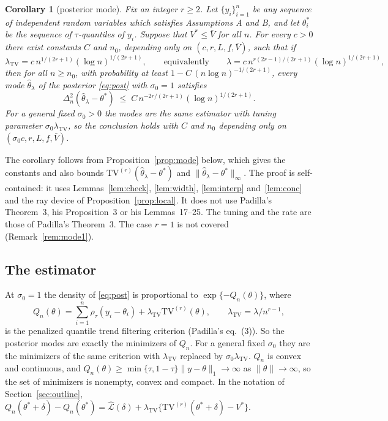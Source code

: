 \documentclass[11pt]{article}
\newtheorem{corollary}{Corollary}
\theoremstyle{definition}
\theoremstyle{remark}
\newcommand{\TV}{\mathrm{TV}}
\newcommand{\lamtv}{\lambda_{\TV}}
\newcommand{\thetas}{\theta^{*}}
\newcommand{\Lh}{\widehat{\mathcal L}}
\newcommand{\fl}{\underline f}
\newcommand{\Vb}{\bar V}
\begin{document}
\begin{corollary}[posterior mode]\label{cor:mode}
Fix an integer $r\ge 2$. Let $\{y_i\}_{i=1}^n$ be any sequence of independent random variables which satisfies Assumptions A and B, and let $\thetas_i$ be the sequence of $\tau$-quantiles of $y_i$. Suppose that $V^{*}\le\Vb$ for all $n$. For every $c>0$ there exist constants $C$ and $n_0$, depending only on $(c,r,L,\fl,\Vb)$, such that if
\[
\lamtv=c\,n^{1/(2r+1)}(\log n)^{1/(2r+1)},\qquad\text{equivalently}\qquad\lambda=c\,n^{r(2r-1)/(2r+1)}(\log n)^{1/(2r+1)},
\]
then for all $n\ge n_0$, with probability at least $1-C\,(n\log n)^{-1/(2r+1)}$, every mode $\hat\theta_\lambda$ of the posterior \eqref{eq:post} with $\sigma_0=1$ satisfies
\[
\Delta_n^2(\hat\theta_\lambda-\thetas)\;\le\;C\,n^{-2r/(2r+1)}(\log n)^{1/(2r+1)} .
\]
For a general fixed $\sigma_0>0$ the modes are the same estimator with tuning parameter $\sigma_0\lamtv$, so the conclusion holds with $C$ and $n_0$ depending only on $(\sigma_0c,r,L,\fl,\Vb)$.
\end{corollary}

The corollary follows from Proposition~\ref{prop:mode} below, which gives the constants and also bounds $\TV^{(r)}(\hat\theta_\lambda-\thetas)$ and $\|\hat\theta_\lambda-\thetas\|_\infty$. The proof is self-contained: it uses Lemmas~\ref{lem:check}, \ref{lem:width}, \ref{lem:interp} and~\ref{lem:conc} and the ray device of Proposition~\ref{prop:local}. It does not use Padilla's Theorem~3, his Proposition~3 or his Lemmas~17--25. The tuning and the rate are those of Padilla's Theorem~3. The case $r=1$ is not covered (Remark~\ref{rem:mode1}).

\subsection{The estimator}

At $\sigma_0=1$ the density of \eqref{eq:post} is proportional to $\exp\{-Q_n(\theta)\}$, where
\[
Q_n(\theta)=\sum_{i=1}^n\rho_\tau(y_i-\theta_i)+\lamtv\TV^{(r)}(\theta),\qquad \lamtv=\lambda/n^{r-1},
\]
is the penalized quantile trend filtering criterion (Padilla's eq.~(3)). So the posterior modes are exactly the minimizers of $Q_n$. For a general fixed $\sigma_0$ they are the minimizers of the same criterion with $\lamtv$ replaced by $\sigma_0\lamtv$. $Q_n$ is convex and continuous, and $Q_n(\theta)\ge\min\{\tau,1-\tau\}\|y-\theta\|_1\to\infty$ as $\|\theta\|\to\infty$, so the set of minimizers is nonempty, convex and compact. In the notation of Section~\ref{sec:outline}, $Q_n(\thetas+\delta)-Q_n(\thetas)=\Lh(\delta)+\lamtv\{\TV^{(r)}(\thetas+\delta)-V^{*}\}$.
\end{document}
